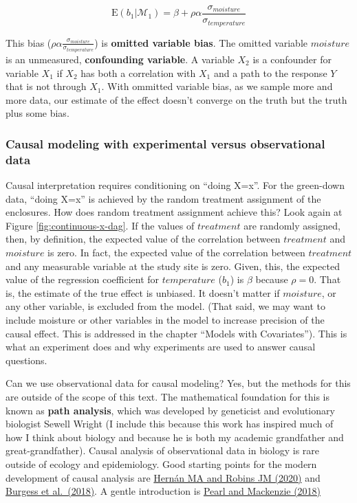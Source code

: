 \documentclass[]{book}
\begin{document}
\begin{equation}
\mathrm{E}(b_1|\mathcal{M}_1) = \beta + \rho \alpha \frac{\sigma_{moisture}}{\sigma_{temperature}}
\end{equation}

This bias (\(\rho \alpha \frac{\sigma_{moisture}}{\sigma_{temperature}}\)) is \textbf{omitted variable bias}. The omitted variable \(moisture\) is an unmeasured, \textbf{confounding variable}. A variable \(X_2\) is a confounder for variable \(X_1\) if \(X_2\) has both a correlation with \(X_1\) and a path to the response \(Y\) that is not through \(X_1\). With ommitted variable bias, as we sample more and more data, our estimate of the effect doesn't converge on the truth but the truth plus some bias.

\hypertarget{causal-modeling-with-experimental-versus-observational-data}{%
\subsubsection{Causal modeling with experimental versus observational data}\label{causal-modeling-with-experimental-versus-observational-data}}

Causal interpretation requires conditioning on ``doing X=x''. For the green-down data, ``doing X=x'' is achieved by the random treatment assignment of the enclosures. How does random treatment assignment achieve this? Look again at Figure \ref{fig:continuous-x-dag}. If the values of \(treatment\) are randomly assigned, then, by definition, the expected value of the correlation between \(treatment\) and \(moisture\) is zero. In fact, the expected value of the correlation between \(treatment\) and any measurable variable at the study site is zero. Given, this, the expected value of the regression coefficient for \(temperature\) (\(b_1\)) is \(\beta\) because \(\rho=0\). That is, the estimate of the true effect is unbiased. It doesn't matter if \(moisture\), or any other variable, is excluded from the model. (That said, we may want to include moisture or other variables in the model to increase precision of the causal effect. This is addressed in the chapter ``Models with Covariates''). This is what an experiment does and why experiments are used to answer causal questions.

Can we use observational data for causal modeling? Yes, but the methods for this are outside of the scope of this text. The mathematical foundation for this is known as \textbf{path analysis}, which was developed by geneticist and evolutionary biologist Sewell Wright (I include this because this work has inspired much of how I think about biology and because he is both my academic grandfather and great-grandfather). Causal analysis of observational data in biology is rare outside of ecology and epidemiology. Good starting points for the modern development of causal analysis are \href{https://www.hsph.harvard.edu/miguel-hernan/causal-inference-book/}{Hernán MA and Robins JM (2020)} and \href{https://www.annualreviews.org/doi/abs/10.1146/annurev-genom-083117-021731}{Burgess et al.~(2018)}. A gentle introduction is \href{https://www.basicbooks.com/titles/judea-pearl/the-book-of-why/9780465097609/}{Pearl and Mackenzie (2018)}
\end{document}
